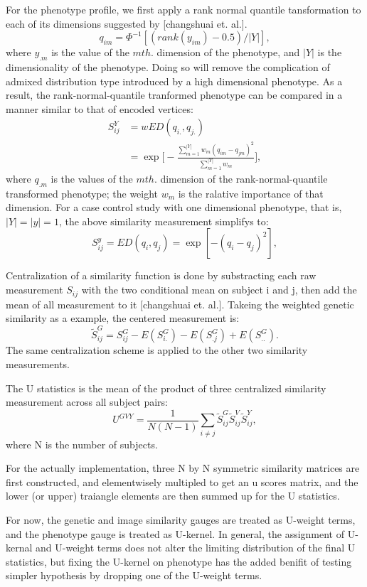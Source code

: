 \documentclass[twocolumn]{article}
\begin{document}
For the phenotype profile, we first apply a rank normal quantile tansformation to each of its dimensions suggested by [changshuai et. al.]. 
\begin{displaymath}
  q_{im}=\Phi^{-1}[(rank(y_{im})-0.5)/|Y|],
\end{displaymath} 
where $y_{.m}$ is the value of the $m th.$ dimension of the phenotype, and $|Y|$ is the dimensionality of the phenotype. Doing so will remove the complication of admixed distribution type introduced by a high dimensional phenotype. As a result, the rank-normal-quantile tranformed phenotype can be compared in a manner similar to that of encoded vertices:
\begin{equation} \label{eq_wSY}
\begin{split}
  S_{ij}^Y &= wED(q_{i.},q_{j.}) \\
  &=\exp
  {
    \Big[-\frac{\sum_{m=1}^{|Y|}{w_m(q_{im}-q_{jm})^2}} {\sum_{m=1}^{|Y|}{w_m}}\Big]
  },
\end{split}
\end{equation}
where $q_{.m}$ is the values of the $m th.$ dimension of the rank-normal-quantile transformed phenotype; the weight $w_m$ is the ralative importance of that dimension. For a case control study with one dimensional phenotype, that is, $|Y|=|y|=1$, the above similarity measurement simplifys to:
\begin{displaymath}
  S_{ij}^{y}=ED(q_i,q_j)=\exp{[-(q_i-q_j)^2]},
\end{displaymath}

Centralization of a similarity function is done by substracting each raw measurement $S_{ij}$ with the two conditional mean on subject i and j, then add the mean of all measurement to it [changshuai et. al.]. Takeing the weighted genetic similarity as a example, the centered measurement is:
\begin{displaymath}
  \tilde{S}_{ij}^{G}=S_{ij}^{G}-E(S_{i.}^{G})-E(S_{.j}^{G})+E(S_{..}^{G}).
\end{displaymath}
The same centralization scheme is applied to the other two similarity measurements.

The U statistics is the mean of the product of three centralized similarity measurement across all subject pairs:
\begin{displaymath}
  U^{GVY}=\frac{1}{N(N-1)}\sum_{i \neq j} \tilde{S}_{ij}^{G} \tilde{S}_{ij}^{V} \tilde{S}_{ij}^{Y},
\end{displaymath}
where N is the number of subjects.



For the actually implementation, three N by N symmetric similarity matrices are first constructed, and elementwisely multipled to get an u scores matrix, and the lower (or upper) traiangle elements are then summed up for the U statistics.

For now, the genetic and image similarity gauges are treated as U-weight terms, and the phenotype gauge is treated as U-kernel. In general, the assignment of U-kernal and U-weight terms does not alter the limiting distribution of the final U statistics, but fixing the U-kernel on phenotype has the added benifit of testing simpler hypothesis by dropping one of the U-weight terms.



\end{document}
